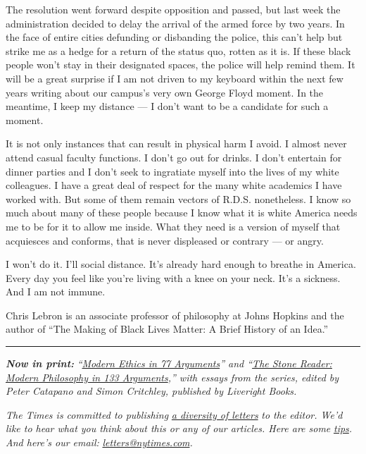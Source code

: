 The resolution went forward despite opposition and passed, but last week
the administration decided to delay the arrival of the armed force by
two years. In the face of entire cities defunding or disbanding the
police, this can't help but strike me as a hedge for a return of the
status quo, rotten as it is. If these black people won't stay in their
designated spaces, the police will help remind them. It will be a great
surprise if I am not driven to my keyboard within the next few years
writing about our campus's very own George Floyd moment. In the
meantime, I keep my distance --- I don't want to be a candidate for such
a moment.

It is not only instances that can result in physical harm I avoid. I
almost never attend casual faculty functions. I don't go out for drinks.
I don't entertain for dinner parties and I don't seek to ingratiate
myself into the lives of my white colleagues. I have a great deal of
respect for the many white academics I have worked with. But some of
them remain vectors of R.D.S. nonetheless. I know so much about many of
these people because I know what it is white America needs me to be for
it to allow me inside. What they need is a version of myself that
acquiesces and conforms, that is never displeased or contrary --- or
angry.

I won't do it. I'll social distance. It's already hard enough to breathe
in America. Every day you feel like you're living with a knee on your
neck. It's a sickness. And I am not immune.

Chris Lebron is an associate professor of philosophy at Johns Hopkins
and the author of ``The Making of Black Lives Matter: A Brief History of
an Idea.''

\begin{center}\rule{0.5\linewidth}{\linethickness}\end{center}

\emph{\textbf{Now in print:}}
\emph{``}\href{http://bitly.com/1MW2kN3}{\emph{Modern Ethics in 77
Arguments}}\emph{'' and ``}\href{http://bitly.com/1MW2kN3}{\emph{The
Stone Reader: Modern Philosophy in 133 Arguments}}\emph{,'' with essays
from the series, edited by Peter Catapano and Simon Critchley, published
by Liveright Books.}

\emph{The Times is committed to publishing}
\href{https://www.nytimes.com/2019/01/31/opinion/letters/letters-to-editor-new-york-times-women.html}{\emph{a
diversity of letters}} \emph{to the editor. We'd like to hear what you
think about this or any of our articles. Here are some}
\href{https://help.nytimes.com/hc/en-us/articles/115014925288-How-to-submit-a-letter-to-the-editor}{\emph{tips}}\emph{.
And here's our email:}
\href{mailto:letters@nytimes.com}{\emph{letters@nytimes.com}}\emph{.}

